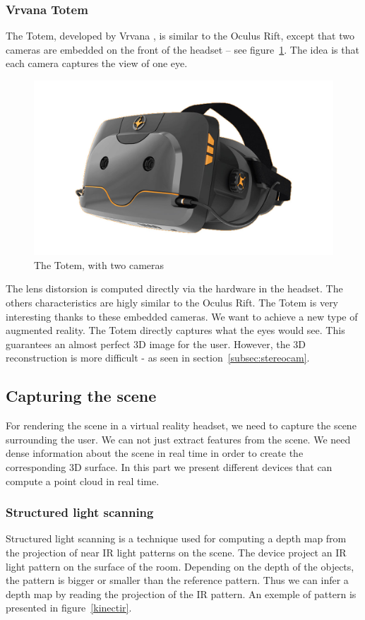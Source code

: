 \documentclass[12pt]{article}
\begin{document}
\subsubsection{Vrvana Totem}
The Totem, developed by Vrvana \cite{Vrvana}, is similar to the Oculus Rift, except that two cameras are embedded on the front of the headset -- see figure~\ref{tpg}. The idea is that each camera captures the view of one eye.

\begin{figure}[h]
  \centering
  \includegraphics[scale=0.3]{TruePlayerGear.jpg}
  \caption{\label{tpg} The Totem, with two cameras}
\end{figure}

The lens distorsion is computed directly via the hardware in the headset. The others characteristics are higly similar to the Oculus Rift. The Totem is very interesting thanks to these embedded cameras. We want to achieve a new type of augmented reality. The Totem directly captures what the eyes would see. This guarantees an almost perfect 3D image for the user. However, the 3D reconstruction is more difficult - as seen in section~\ref{subsec:stereocam}.

\subsection{Capturing the scene}
For rendering the scene in a virtual reality headset, we need to capture the scene surrounding the user. We can not just extract features from the scene. We need dense information about the scene in real time in order to create the corresponding 3D surface. In this part we present different devices that can compute a point cloud in real time.

\subsubsection{Structured light scanning}
Structured light scanning is a technique used for computing a depth map from the projection of near IR light patterns on the scene. The device project an IR light pattern on the surface of the room. Depending on the depth of the objects, the pattern is bigger or smaller than the reference pattern. Thus we can infer a depth map by reading the projection of the IR pattern. An exemple of pattern is presented in figure~\ref{kinectir}.
\end{document}

